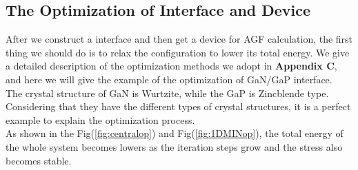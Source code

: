 \subsection{The Optimization of Interface and Device}
After we construct a interface and then get a device for AGF calculation, the first thing we should do is to relax the configuration to lower its total energy. We give a detailed description of the optimization methods we adopt in  \textbf{Appendix C}, and here we will give the example of the optimization of GaN/GaP interface.\\
\indent The crystal structure of GaN is Wurtzite, while the GaP is Zincblende type. Considering that they have the different types of crystal structures, it is a perfect example to explain the optimization process.\\
\indent As shown in the Fig(\ref{fig:centralop}) and Fig(\ref{fig:1DMINop}), the total energy of the whole system becomes lowers as the iteration steps grow and the stress also becomes stable.

